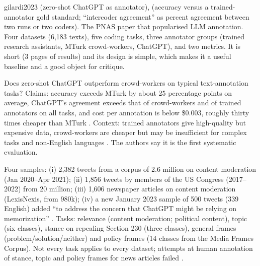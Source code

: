 \begin{papercard}{gilardi2023}
  (zero-shot ChatGPT as annotator),  (accuracy versus a trained-annotator gold standard; ``intercoder agreement'' as percent agreement between two runs or two coders). The PNAS paper that popularised LLM annotation. Four datasets (6,183 texts), five coding tasks, three annotator groups (trained research assistants, MTurk crowd-workers, ChatGPT), and two metrics. It is short (3 pages of results) and its design is simple, which makes it a useful baseline and a good object for critique.

 Does zero-shot ChatGPT outperform crowd-workers on typical text-annotation tasks? Claims: accuracy exceeds MTurk by about 25 percentage points on average, ChatGPT's agreement exceeds that of crowd-workers and of trained annotators on all tasks, and cost per annotation is below \$0.003, roughly thirty times cheaper than MTurk . Context: trained annotators give high-quality but expensive data, crowd-workers are cheaper but may be insufficient for complex tasks and non-English languages . The authors say it is the first systematic evaluation.

 Four samples: (i) 2,382 tweets from a corpus of 2.6 million on content moderation (Jan 2020--Apr 2021); (ii) 1,856 tweets by members of the US Congress (2017--2022) from 20 million; (iii) 1,606 newspaper articles on content moderation (LexisNexis, from 980k); (iv) a new January 2023 sample of 500 tweets (339 English) added ``to address the concern that ChatGPT might be relying on memorization'' . Tasks: relevance (content moderation; political content), topic (six classes), stance on repealing Section 230 (three classes), general frames (problem/solution/neither) and policy frames (14 classes from the Media Frames Corpus). Not every task applies to every dataset; attempts at human annotation of stance, topic and policy frames for news articles failed .


\end{papercard}
